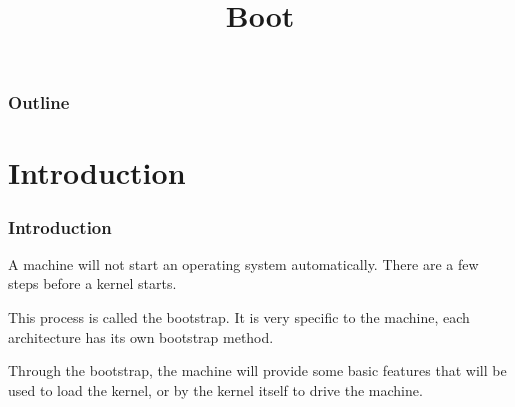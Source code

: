 %
%
%
%
%
%

%
%

%
%

\def\path{../../..}

%
%



%
%

\title{Boot}

%
%



%
%

\begin{frame}
  \titlepage
\end{frame}

%
%

\begin{frame}
  \frametitle{Outline}

  \tableofcontents
\end{frame}

%
%

%
%

\section{Introduction}

\begin{frame}
  \frametitle{Introduction}

  A machine will not start an operating system automatically. There are a few steps before a kernel starts.

  \-

  This process is called the bootstrap. It is very specific to the machine, each architecture has its own bootstrap method.

  \-

  Through the bootstrap, the machine will provide some basic features that will be used to load the kernel, or by the kernel itself to drive the machine.

\end{frame}

